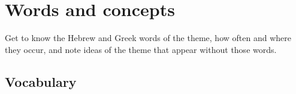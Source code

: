 \chapter{Words and concepts}

\begin{objetivo}
Get to know the Hebrew and Greek words of the theme, how often and where they
occur, and note ideas of the theme that appear without those words.
\end{objetivo}

\section{Vocabulary}
\vocabulariodotema


